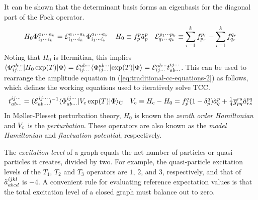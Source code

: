 \documentclass[11pt]{article}
\numberwithin{equation}{section}
\begin{document}
\begin{rmk}
It can be shown that the determinant basis forms an eigenbasis for the diagonal part of the Fock operator.\footnotemark
\begin{align}
  H_0\Phi _{i_1\cdots i_k}^{a_1\cdots a_k}
=
  \mathcal{E}_{i_1\cdots i_k}^{a_1\cdots a_k}
  \Phi _{i_1\cdots i_k}^{a_1\cdots a_k}
&&
  H_0
\equiv
  f_p^p\tilde{a}^p_p
&&
  \mathcal{E}_{q_1\cdots q_k}^{p_1\cdots p_k}
\equiv
  \sum_{r=1}^k
  f_{p_r}^{p_r}
-
  \sum_{r=1}^k
  f_{q_r}^{q_r}
\end{align}
Noting that $H_0$ is Hermitian, this implies $\langle\Phi _{ij\cdots}^{ab\cdots}|H_0\,\mathrm{exp}(T)|\Phi \rangle=\mathcal{E}_{ij\cdots}^{ab\cdots}\langle\Phi _{ij\cdots}^{ab\cdots}|\mathrm{exp}(T)|\Phi \rangle=\mathcal{E}_{ij\cdots}^{ab\cdots}t_{ab\cdots}^{ij\cdots}$.
This can be used to rearrange the amplitude equation in (\ref{eq:traditional-cc-equations-2}) as follows, which defines the working equations used to iteratively solve TCC.
\begin{align}
  t_{ab\cdots}^{ij\cdots}
=
  (\mathcal{E}_{ab\cdots}^{ij\cdots})^{-1}
  \langle\Phi _{ab\cdots}^{ij\cdots}|V_{\mathrm{c}}\,\mathrm{exp}(T)|\Phi \rangle_{\mathrm{C}}
&&
  V_{\mathrm{c}}
\equiv
  H_{\mathrm{c}}
-
  H_0
=
  f_p^q(1-\delta _p^q)
  \tilde{a}^p_q
+
  \tfrac{1}{4}
  \overline{g}_{pq}^{rs}
  \tilde{a}^{pq}_{rs}
\end{align}
In M\o ller-Plesset perturbation theory, $H_0$ is known the \textit{zeroth order Hamiltonian} and $V_{\mathrm{c}}$ is the \textit{perturbation}.
These operators are also known as the \textit{model Hamiltonian} and \textit{fluctuation potential}, respectively.
\end{rmk}


\begin{dfn}
The \textit{excitation level} of a graph equals the net number of particles or quasi-particles it creates, divided by two.
For example, the quasi-particle excitation levels of the $T_1$, $T_2$ and $T_3$ operators are $1$, $2$, and $3$, respectively, and that of $\tilde{a}_{abcd}^{ijkl}$ is $-4$.
A convenient rule for evaluating reference expectation values is that the total excitation level of a closed graph must balance out to zero.
\end{dfn}
\end{document}
